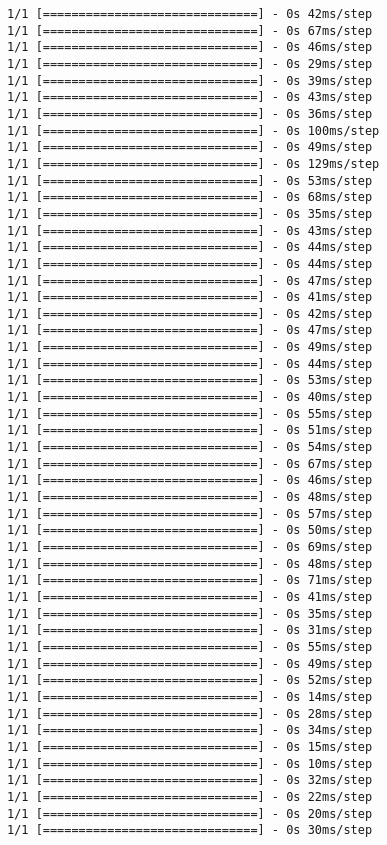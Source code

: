 \documentclass[11pt]{article}
\begin{document}
\begin{Verbatim}[commandchars=\\\{\}]
1/1 [==============================] - 0s 42ms/step
1/1 [==============================] - 0s 67ms/step
1/1 [==============================] - 0s 46ms/step
1/1 [==============================] - 0s 29ms/step
1/1 [==============================] - 0s 39ms/step
1/1 [==============================] - 0s 43ms/step
1/1 [==============================] - 0s 36ms/step
1/1 [==============================] - 0s 100ms/step
1/1 [==============================] - 0s 49ms/step
1/1 [==============================] - 0s 129ms/step
1/1 [==============================] - 0s 53ms/step
1/1 [==============================] - 0s 68ms/step
1/1 [==============================] - 0s 35ms/step
1/1 [==============================] - 0s 43ms/step
1/1 [==============================] - 0s 44ms/step
1/1 [==============================] - 0s 44ms/step
1/1 [==============================] - 0s 47ms/step
1/1 [==============================] - 0s 41ms/step
1/1 [==============================] - 0s 42ms/step
1/1 [==============================] - 0s 47ms/step
1/1 [==============================] - 0s 49ms/step
1/1 [==============================] - 0s 44ms/step
1/1 [==============================] - 0s 53ms/step
1/1 [==============================] - 0s 40ms/step
1/1 [==============================] - 0s 55ms/step
1/1 [==============================] - 0s 51ms/step
1/1 [==============================] - 0s 54ms/step
1/1 [==============================] - 0s 67ms/step
1/1 [==============================] - 0s 46ms/step
1/1 [==============================] - 0s 48ms/step
1/1 [==============================] - 0s 57ms/step
1/1 [==============================] - 0s 50ms/step
1/1 [==============================] - 0s 69ms/step
1/1 [==============================] - 0s 48ms/step
1/1 [==============================] - 0s 71ms/step
1/1 [==============================] - 0s 41ms/step
1/1 [==============================] - 0s 35ms/step
1/1 [==============================] - 0s 31ms/step
1/1 [==============================] - 0s 55ms/step
1/1 [==============================] - 0s 49ms/step
1/1 [==============================] - 0s 52ms/step
1/1 [==============================] - 0s 14ms/step
1/1 [==============================] - 0s 28ms/step
1/1 [==============================] - 0s 34ms/step
1/1 [==============================] - 0s 15ms/step
1/1 [==============================] - 0s 10ms/step
1/1 [==============================] - 0s 32ms/step
1/1 [==============================] - 0s 22ms/step
1/1 [==============================] - 0s 20ms/step
1/1 [==============================] - 0s 30ms/step

\end{Verbatim}
\end{document}
